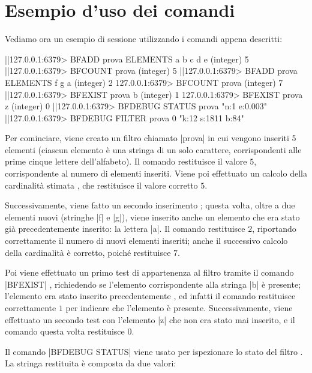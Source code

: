 \section{Esempio d'uso dei comandi}

Vediamo ora un esempio di sessione utilizzando i comandi appena descritti:

\medskip
\begin{commentedsource}[style=redis,caption=Esempio di utilizzo dei nuovi comandi per i filtri di Bloom]
|\lnote|127.0.0.1:6379> BFADD prova ELEMENTS a b c d e
(integer) 5
|\lnote|127.0.0.1:6379> BFCOUNT prova
(integer) 5
|\lnote|127.0.0.1:6379> BFADD prova ELEMENTS f g a
(integer) 2
127.0.0.1:6379> BFCOUNT prova
(integer) 7
|\lnote|127.0.0.1:6379> BFEXIST prova b
(integer) 1
127.0.0.1:6379> BFEXIST prova z
(integer) 0
|\lnote|127.0.0.1:6379> BFDEBUG STATUS prova
"n:1 e:0.003"
|\lnote|127.0.0.1:6379> BFDEBUG FILTER prova 0
"k:12 s:1811 b:84"
\end{commentedsource}

Per cominciare, viene creato un filtro chiamato \cverb|prova|  in cui vengono inseriti 5
elementi (ciascun elemento è una stringa di un solo carattere, corrispondenti alle prime cinque
lettere dell'alfabeto). Il comando restituisce il valore $5$, corrispondente al numero di elementi
inseriti. Viene poi effettuato un calcolo della cardinalità stimata , che
restituisce il valore corretto $5$.

Successivamente, viene fatto un secondo inserimento ; questa volta, oltre a due
elementi nuovi (stringhe \cverb|f| e \cverb|g|), viene inserito anche un elemento che era stato
già precedentemente inserito: la lettera \cverb|a|. Il comando restituisce $2$, riportando
correttamente il numero di nuovi elementi inseriti; anche il successivo calcolo della
cardinalità è corretto, poiché restituisce $7$.

Poi viene effettuato un primo test di appartenenza al filtro tramite il comando \cverb|BFEXIST|
, richiedendo se l'elemento corrispondente alla stringa \cverb|b| è presente; l'elemento era
stato inserito precedentemente , ed infatti il comando restituisce correttamente $1$ per
indicare che l'elemento è presente. Successivamente, viene effettuato un secondo test con l'elemento
\cverb|z| che non era stato mai inserito, e il comando questa volta restituisce $0$.

Il comando \cverb|BFDEBUG STATUS| viene usato per ispezionare lo
stato del filtro . La stringa restituita è composta da due valori:

